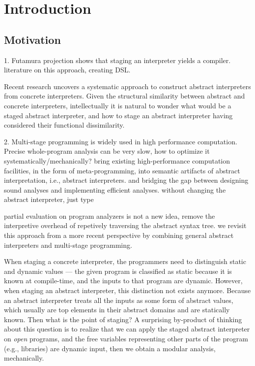 \section{Introduction}

\subsection{Motivation}

1. Futamura projection \cite{Futamura1999} shows that staging an interpreter yields a compiler.
literature on this approach, creating DSL.

Recent research uncovers a systematic approach to construct abstract interpreters from concrete interpreters.
Given the structural similarity between abstract and concrete interpreters, intellectually it is natural to 
wonder what would be a staged abstract interpreter, and how to stage an abstract interpreter 
having considered their functional dissimilarity.

2. Multi-stage programming is widely used in high performance computation.
Precise whole-program analysis can be very slow, how to optimize it systematically/mechanically?
bring existing high-performance computation facilities, in the form of meta-programming, into
semantic artifacts of abstract interpretation, i.e., abstract interpreters.
and bridging the gap between designing sound analyses and implementing efficient analyses.
without changing the abstract interpreter, just type

partial evaluation on program analyzers is not a new idea, remove the interpretive overhead of repetively 
traversing the abstract syntax tree.
we revisit this approach from a more recent perspective by combining general abstract interpreters
and multi-stage programming.

When staging a concrete interpreter, the programmers need to distinguish static and dynamic values
--- the given program is classified as static because it is known at compile-time, and the inputs to that program 
are dynamic. However, when staging an abstract interpreter, this distinction not exists anymore. 
Because an abstract interpreter treats all the inputs as some form of abstract values, which usually are 
top elements in their abstract domains and are statically known. Then what is the point of staging?
A surprising by-product of thinking about this question is to realize that we can apply the staged
abstract interpreter on \textit{open} programs, and the free variables representing other parts of 
the program (e.g., libraries) are dynamic input, then we obtain a modular analysis, mechanically.

